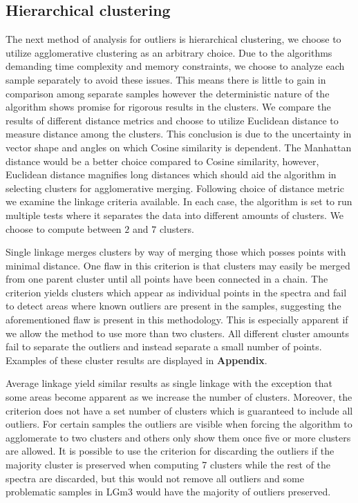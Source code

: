 \subsection{Hierarchical clustering}

The next method of analysis for outliers is hierarchical clustering, we choose to utilize agglomerative clustering as an arbitrary choice. Due to the algorithms demanding time complexity and memory constraints, we choose to analyze each sample separately to avoid these issues. This means there is little to gain in comparison among separate samples however the deterministic nature of the algorithm shows promise for rigorous results in the clusters. We compare the results of different distance metrics and choose to utilize Euclidean distance to measure distance among the clusters. This conclusion is due to the uncertainty in vector shape and angles on which Cosine similarity is dependent. The Manhattan distance would be a better choice compared to Cosine similarity, however, Euclidean distance magnifies long distances which should aid the algorithm in selecting clusters for agglomerative merging. Following choice of distance metric we examine the linkage criteria available. In each case, the algorithm is set to run multiple tests where it separates the data into different amounts of clusters. We choose to compute between $2$ and $7$ clusters.

Single linkage merges clusters by way of merging those which posses points with minimal distance. One flaw in this criterion is that clusters may easily be merged from one parent cluster until all points have been connected in a chain. The criterion yields clusters which appear as individual points in the spectra and fail to detect areas where known outliers are present in the samples, suggesting the aforementioned flaw is present in this methodology. This is especially apparent if we allow the method to use more than two clusters. All different cluster amounts fail to separate the outliers and instead separate a small number of points. Examples of these cluster results are displayed in \textbf{Appendix}.

Average linkage yield similar results as single linkage with the exception that some areas become apparent as we increase the number of clusters. Moreover, the criterion does not have a set number of clusters which is guaranteed to include all outliers. For certain samples the outliers are visible when forcing the algorithm to agglomerate to two clusters and others only show them once five or more clusters are allowed. It is possible to use the criterion for discarding the outliers if the majority cluster is preserved when computing 7 clusters while the rest of the spectra are discarded, but this would not remove all outliers and some problematic samples in LGm3 would have the majority of outliers preserved. 

